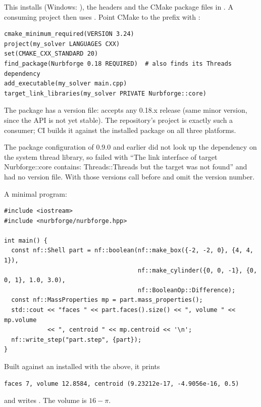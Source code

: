 This installs  (Windows: ), the headers
and the CMake package files in . A consuming project then uses
. Point CMake to the prefix with :

\begin{lstlisting}[style=cmake]
cmake_minimum_required(VERSION 3.24)
project(my_solver LANGUAGES CXX)
set(CMAKE_CXX_STANDARD 20)
find_package(Nurbforge 0.18 REQUIRED)  # also finds its Threads dependency
add_executable(my_solver main.cpp)
target_link_libraries(my_solver PRIVATE Nurbforge::core)
\end{lstlisting}

The package has a version file:  accepts any 0.18.x release
(same minor version, since the API is not yet stable). The repository's
 project is exactly such a consumer; CI builds it against the installed
package on all three platforms.

\begin{note}
The package configuration of 0.9.0 and earlier did not look up the dependency on the system
thread library, so  failed with ``The link interface of target
Nurbforge::core contains: Threads::Threads but the target was not found'' and had no version
file. With those versions call  before
 and omit the version number.
\end{note}

A minimal program:

\begin{lstlisting}[style=cpp]
#include <iostream>
#include <nurbforge/nurbforge.hpp>

int main() {
  const nf::Shell part = nf::boolean(nf::make_box({-2, -2, 0}, {4, 4, 1}),
                                     nf::make_cylinder({0, 0, -1}, {0, 0, 1}, 1.0, 3.0),
                                     nf::BooleanOp::Difference);
  const nf::MassProperties mp = part.mass_properties();
  std::cout << "faces " << part.faces().size() << ", volume " << mp.volume
            << ", centroid " << mp.centroid << '\n';
  nf::write_step("part.step", {part});
}
\end{lstlisting}

Built against an installed \NF{} with the  above, it prints
\begin{lstlisting}[style=text]
faces 7, volume 12.8584, centroid (9.23212e-17, -4.9056e-16, 0.5)
\end{lstlisting}
and writes . The volume is $16-\pi$.

